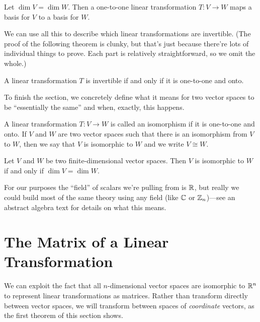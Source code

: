 \documentclass[../m073main.tex]{subfiles}
\begin{document}
\begin{corollary}
	Let $\dim V = \dim W$.
	Then a one-to-one linear transformation $T : V \to W$ maps a basis for $V$ to a basis for $W$.
\end{corollary}

We can use all this to describe which linear transformations are invertible.
(The proof of the following theorem is clunky, but that's just because there're lots of individual things to prove.
Each part is relatively straightforward, so we omit the whole.)

\begin{theorem}
	A linear transformation $T$ is invertible if and only if it is one-to-one and onto.
\end{theorem}

To finish the section, we concretely define what it means for two vector spaces to be ``essentially the same'' and when, exactly, this happens.

\begin{definition}[Isomorphism]
	A linear transformation $T : V \to W$ is called an isomorphism if it is one-to-one and onto.
	If $V$ and $W$ are two vector spaces such that there is an isomorphism from $V$ to $W$, then we say that $V$ is isomorphic to $W$ and we write $V \cong W$.
\end{definition}
\begin{theorem}
	Let $V$ and $W$ be two finite-dimensional vector spaces.
	Then $V$ is isomorphic to $W$ if and only if $\dim V = \dim W$.
\end{theorem}

For our purposes the ``field'' of scalars we're pulling from is $\mathbb{R}$, but really we could build most of the same theory using any field (like $\mathbb{C}$ or $\mathbb{Z}_n$)---see an abstract algebra text for details on what this means.



\section{The Matrix of a Linear Transformation}
We can exploit the fact that all $n$-dimensional vector spaces are isomorphic to $\mathbb{R}^n$ to represent linear transformations as matrices.
Rather than transform directly between vector spaces, we will transform between spaces of \textit{coordinate} vectors, as the first theorem of this section shows.
\end{document}
